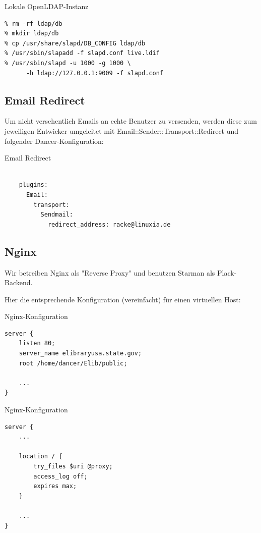 \begin{frame}[fragile]{Lokale OpenLDAP-Instanz}
\begin{lstlisting}
% rm -rf ldap/db
% mkdir ldap/db
% cp /usr/share/slapd/DB_CONFIG ldap/db
% /usr/sbin/slapadd -f slapd.conf live.ldif
% /usr/sbin/slapd -u 1000 -g 1000 \
      -h ldap://127.0.0.1:9009 -f slapd.conf
\end{lstlisting}
\end{frame}

\subsection{Email Redirect}

Um nicht versehentlich Emails an echte Benutzer zu versenden,
werden diese zum jeweiligen Entwicker umgeleitet mit
Email::Sender::Transport::Redirect und folgender
Dancer-Konfiguration:

\begin{frame}[fragile]{Email Redirect}
\begin{lstlisting}

    plugins:
      Email:
        transport:
          Sendmail:
            redirect_address: racke@linuxia.de

\end{lstlisting}
\end{frame}

\subsection{Nginx}
    
Wir betreiben Nginx als "Reverse Proxy" und benutzen Starman als
Plack-Backend.

Hier die entsprechende Konfiguration (vereinfacht) für einen virtuellen
Host:

\begin{frame}[fragile]{Nginx-Konfiguration}
\begin{lstlisting}
server {
    listen 80;
    server_name elibraryusa.state.gov;
    root /home/dancer/Elib/public;

    ...
}
\end{lstlisting}
\end{frame}

\begin{frame}[fragile]{Nginx-Konfiguration}
\begin{lstlisting}
server {
    ...

    location / {
        try_files $uri @proxy;
        access_log off;
        expires max;
    }

    ...
}
\end{lstlisting}
\end{frame}

